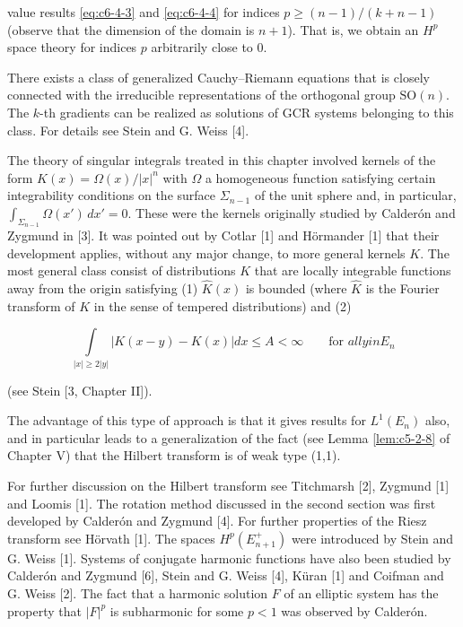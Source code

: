 value results \eqref{eq:c6-4-3} and \eqref{eq:c6-4-4} for indices $p \geq (n - 1)/(k + n - 1)$ (observe that the dimension of the domain is $n + 1$). That is, we obtain an $H^p$ space theory for indices $p$ arbitrarily close to 0.

There exists a class of generalized Cauchy--Riemann equations that is closely connected with the irreducible representations of the orthogonal group $\mathrm{SO}(n)$. The $k$-th gradients can be realized as solutions of GCR systems belonging to this class. For details see Stein and G. Weiss [4].

 The theory of singular integrals treated in this chapter involved kernels of the form $K(x) = \Omega(x)/|x|^n$ with $\Omega$ a homogeneous function satisfying certain integrability conditions on the surface $\Sigma_{n-1}$ of the unit sphere and, in particular, $\int_{\Sigma_{n-1}} \Omega(x') \, dx' = 0$. These were the kernels originally studied by Calderón and Zygmund in [3]. It was pointed out by Cotlar [1] and Hörmander [1] that their development applies, without any major change, to more general kernels $K$. The most general class consist of distributions $K$ that are locally integrable functions away from the origin satisfying (1) $\hat{K}(x)$ is bounded (where $\hat{K}$ is the Fourier transform of $K$ in the sense of tempered distributions) and (2)

\[
\int\limits_{|x|\geq2|y|}\left|K(x-y)-K(x)\right|dx\le A<\infty\qquad \text{for } all y in E_{n}
\]

(see Stein [3, Chapter II]).

The advantage of this type of approach is that it gives results for $L^{1}(E_{n})$ also, and in particular leads to a generalization of the fact (see Lemma \ref{lem:c5-2-8} of Chapter V) that the Hilbert transform is of weak type (1,1).

\bibnoteshead

For further discussion on the Hilbert transform see Titchmarsh [2], Zygmund [1] and Loomis [1]. The rotation method discussed in the second section was first developed by Calderón and Zygmund [4]. For further properties of the Riesz transform see Hörvath [1]. The spaces $H^{p}(E_{n+1}^{+})$ were introduced by Stein and G. Weiss [1]. Systems of conjugate harmonic functions have also been studied by Calderón and Zygmund [6], Stein and G. Weiss [4], Küran [1] and Coifman and G. Weiss [2]. The fact that a harmonic solution $F$ of an elliptic system has the property that $|F|^{p}$ is subharmonic for some $p < 1$ was observed by Calderón.

